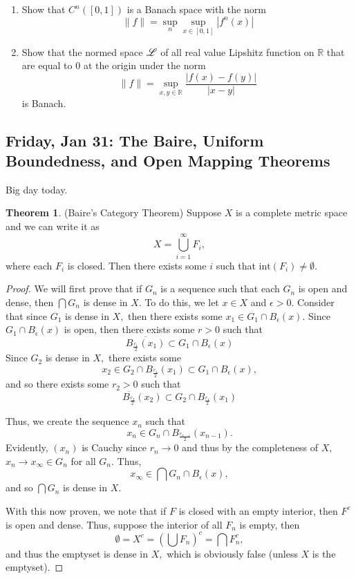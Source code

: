 \documentclass[10pt, oneside]{article}
\newcommand{\bbR}{\mathbb{R}}
\theoremstyle{definition}
\newtheorem{thm}{Theorem}
\begin{document}
\begin{enumerate}
\item Show that $C^n([0,1])$ is a Banach space with the norm 
\[\|f\| = \sup_n \sup_{x\in [0,1]}|f^n(x)|\]
\item Show that the normed space $\cal L$ of all real value Lipshitz function on $\bbR$ that are equal to $0$ at the origin under the norm
\[\|f\| = \sup_{x,y \in \bbR}\frac{|f(x) - f(y)|}{|x-y|}\] is Banach.
\end{enumerate}

\newpage
\subsection{Friday, Jan 31: The Baire, Uniform Boundedness, and Open Mapping Theorems}
Big day today.
\begin{thm} (Baire's Category Theorem)
    Suppose $X$ is a complete metric space and we can write it as \[X = \bigcup_{i=1}^\infty F_i,\] where each $F_i$ is closed. Then there exists some $i$ such that $\text{int}(F_i) \neq \emptyset.$
\end{thm}
\begin{proof}
    We will first prove that if $G_n$ is a sequence such that each $G_n$ is open and dense, then $\bigcap G_n$ is dense in $X.$ To do this, we let $x\in X$ and $\epsilon>0.$ Consider that since $G_1$ is dense in $X,$ then there exists some $x_1 \in G_1\cap B_\epsilon(x).$ Since $G_1 \cap B_\epsilon(x)$ is open, then there exists some $r>0$ such that 
    \[\overline{B_{\frac{r_1}{2}}(x_1)}\subset G_1 \cap B_\epsilon(x)\] Since $G_2$ is dense in $X,$ there exists some \[x_2 \in G_2 \cap B_{\frac{r_1}{2}}(x_1)\subset G_1 \cap B_\epsilon(x),\] and so there exists some $r_2 >0$ such that 
    \[\overline{B_{\frac{r_2}{2}}}(x_2)\subset G_2 \cap B_\frac{r_1}{2}(x_1)\]
    
    Thus, we create the sequence $x_n$ such that \[x_n \in G_n \cap B_\frac{r_{n-1}}{2}(x_{n-1}).\] Evidently, $(x_n)$ is Cauchy since $r_n \to 0$ and thus by the completeness of $X,$ $x_n \to x_\infty \in G_n$ for all $G_n.$ Thus, \[x_\infty \in \bigcap G_n \cap B_\epsilon(x),\] and so $\bigcap G_n$ is dense in $X.$

    With this now proven, we note that if $F$ is closed with an empty interior, then $F^c$ is open and dense. Thus, suppose the interior of all $F_n$ is empty, then 
    \[\emptyset = X^c = \left(\bigcup F_n\right)^c = \bigcap F_n^c,\] and thus the emptyset is dense in $X,$ which is obviously false (unless $X$ is the emptyset). 
\end{proof}
\end{document}
